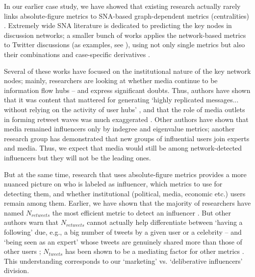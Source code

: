 In our earlier case study, we have showed that existing research actually rarely links absolute-figure metrics to SNA-based graph-dependent metrics (centralities) \cite{BodrunovaBlekanovMaksimov}. Extremely wide SNA literature is dedicated to predicting the key nodes in discussion networks; a smaller bunch of works applies the network-based metrics to Twitter discussions (as examples, see \cite{DuboisGaffney,AlmindIngwersen}), using not only single metrics but also their combinations \cite{KwakLeePark,GonzalezBailonBorgeHolthoeferMoreno} and case-specific derivatives \cite{MairederWeeksDeZuniga}.

Several of these works have focused on the institutional nature of the key network nodes; mainly, researchers are looking at whether media continue to be information flow hubs -- and express significant doubts. Thus, authors \cite{BastosRaimundoTravitzki} have shown that it was content that mattered for generating ‘highly replicated messages... without relying on the activity of user hubs’ \cite[p.~260]{BastosRaimundoTravitzki}, and that the role of media outlets in forming retweet waves was much exaggerated \cite[p.~269]{AlmindIngwersen}. Other authors \cite{DuboisGaffney} have shown that media remained influencers only by indegree and eigenvalue metrics; another research group \cite{HilbertVasquezHalpern} has demonstrated that new groups of influential users join experts and media. Thus, we expect that media would still be among network-detected influencers but they will not be the leading ones.

But at the same time, research that uses absolute-figure metrics provides a more nuanced picture on who is labeled as influencer, which metrics to use for detecting them, and whether institutional (political, media, economic etc.) users remain among them. Earlier, we have shown that the majority of researchers have named \(N_{retweets}\) the most efficient metric to detect an influencer \cite{BodrunovaLitvinenkoBlekanov2016}. But other authors warn that \(N_{retweets}\) cannot actually help differentiate between ‘having a following’ due, e.g., a big number of tweets by a given user or a celebrity -- and ‘being seen as an expert’ whose tweets are genuinely shared more than those of other users \cite[p.~1263]{DuboisGaffney}; \(N_{tweets}\) has been shown to be a mediating factor for other metrics \cite{Jungherr}. This understanding corresponds to our ‘marketing’ vs. ‘deliberative influencers’ division.

